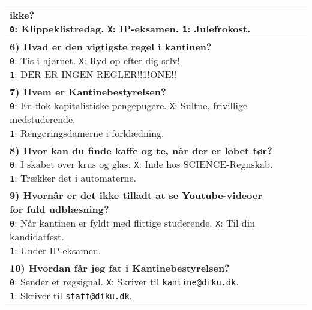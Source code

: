 \begin{center}
\begin{tabular}{|p{12cm}|p{0.2cm}|p{0.2cm}|p{0.2cm}|}
{{  ikke?} \\
  \texttt{0}: Klippeklistredag. \quad
  \texttt{X}: IP-eksamen. \quad
  \texttt{1}: Julefrokost.
  \vspace{0.1cm}
} & & & \\\hline
\parbox{12cm}{
  \vspace{0.2cm}
  \textbf{6) Hvad er den vigtigste regel i kantinen?} \\
  \texttt{0}: Tis i hjørnet. \quad
  \texttt{X}: Ryd op efter dig selv! \\
  \texttt{1}: DER ER INGEN REGLER!!1!ONE!!
  \vspace{0.1cm}
} & & & \\\hline
\parbox{12cm}{
  \vspace{0.2cm}
  \textbf{7) Hvem er Kantinebestyrelsen?} \\
  \texttt{0}: En flok kapitalistiske pengepugere. \quad
  \texttt{X}: Sultne, frivillige medstuderende. \\
  \texttt{1}: Rengøringsdamerne i forklædning.
  \vspace{0.1cm}
} & & & \\\hline
\parbox{12cm}{
  \vspace{0.2cm}
  \textbf{8) Hvor kan du finde kaffe og te, når der er løbet tør?} \\
  \texttt{0}: I skabet over krus og glas. \quad
  \texttt{X}: Inde hos SCIENCE-Regnskab. \\
  \texttt{1}: Trækker det i automaterne.
  \vspace{0.1cm}
} & & & \\\hline
\parbox{12cm}{
  \vspace{0.2cm}
  \textbf{9) Hvornår er det ikke tilladt at se Youtube-videoer for fuld
  udblæsning?} \\
  \texttt{0}: Når kantinen er fyldt med flittige studerende. \quad
  \texttt{X}: Til din kandidatfest. \\
  \texttt{1}: Under IP-eksamen.
  \vspace{0.1cm}
} & & & \\\hline
\parbox{12cm}{
  \vspace{0.2cm}
  \textbf{10) Hvordan får jeg fat i Kantinebestyrelsen?} \\
  \texttt{0}: Sender et røgsignal. \quad
  \texttt{X}: Skriver til \texttt{kantine@diku.dk}. \\
  \texttt{1}: Skriver til \texttt{staff@diku.dk}.
  \vspace{0.1cm}
} & & & \\\hline

\end{tabular}
\end{center}
